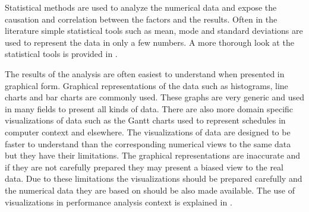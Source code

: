Statistical methods are used to analyze the numerical data and expose the causation and correlation between the factors and the results. Often in the literature simple statistical tools such as mean, mode and standard deviations are used to represent the data in only a few numbers. A more thorough look at the statistical tools is provided in \cite{jain1991art}.  

The results of the analysis are often easiest to understand when presented in graphical form. Graphical representations of the data such as histograms, line charts and bar charts are commonly used. These graphs are very generic and used in many fields to present all kinds of data. There are also more domain specific visualizations of data such as the Gantt charts used to represent schedules in computer context and elsewhere. The visualizations of data are designed to be faster to understand than the corresponding numerical views to the same data but they have their limitations. The graphical representations are inaccurate and if they are not carefully prepared they may present a biased view to the real data. Due to these limitations the visualizations should be prepared carefully and the numerical data they are based on should be also made available. The use of visualizations in performance analysis context is explained in \cite{jain1991art}. 

